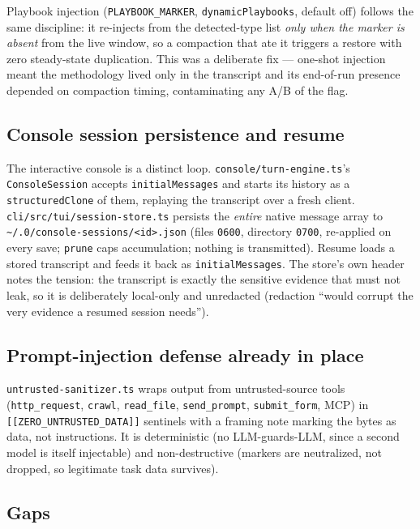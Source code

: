 \documentclass[11pt]{article}
\begin{document}
Playbook injection (\texttt{PLAYBOOK\_MARKER}, \texttt{dynamicPlaybooks},
default off) follows the same discipline: it re-injects from the detected-type
list \emph{only when the marker is absent} from the live window, so a compaction
that ate it triggers a restore with zero steady-state duplication. This was a
deliberate fix --- one-shot injection meant the methodology lived only in the
transcript and its end-of-run presence depended on compaction timing,
contaminating any A/B of the flag.

\subsection{Console session persistence and resume}

The interactive console is a distinct loop. \texttt{console/turn-engine.ts}'s
\texttt{ConsoleSession} accepts \texttt{initialMessages} and starts its history
as a \texttt{structuredClone} of them, replaying the transcript over a fresh
client. \texttt{cli/src/tui/session-store.ts} persists the \emph{entire} native
message array to \texttt{\~{}/.0/console-sessions/<id>.json} (files
\texttt{0600}, directory \texttt{0700}, re-applied on every save; \texttt{prune}
caps accumulation; nothing is transmitted). Resume loads a stored transcript and
feeds it back as \texttt{initialMessages}. The store's own header notes the
tension: the transcript is exactly the sensitive evidence that must not leak, so
it is deliberately local-only and unredacted (redaction ``would corrupt the very
evidence a resumed session needs'').

\subsection{Prompt-injection defense already in place}

\texttt{untrusted-sanitizer.ts} wraps output from untrusted-source tools
(\texttt{http\_request}, \texttt{crawl}, \texttt{read\_file}, \texttt{send\_prompt},
\texttt{submit\_form}, MCP) in \texttt{[[ZERO\_UNTRUSTED\_DATA]]} sentinels with a
framing note marking the bytes as data, not instructions. It is deterministic
(no LLM-guards-LLM, since a second model is itself injectable) and
non-destructive (markers are neutralized, not dropped, so legitimate task data
survives).

\subsection{Gaps}
\end{document}
